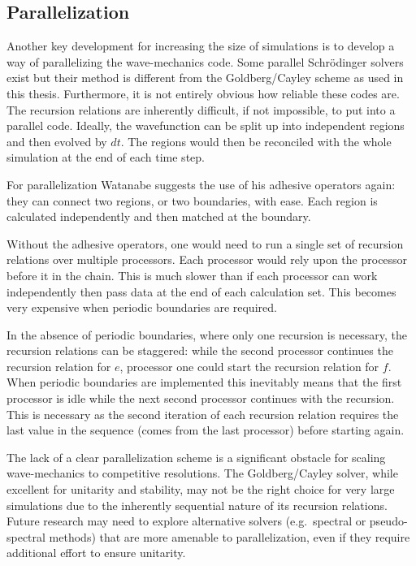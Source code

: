 \subsection{Parallelization}
Another key development for increasing the size of simulations is to develop a way of parallelizing the wave-mechanics code. Some parallel Schr\"odinger solvers \citep{bib_yee, bib_schn, bib_str} exist but their method is different from the Goldberg/Cayley scheme as used in this thesis. Furthermore, it is not entirely obvious how reliable these codes are. The recursion relations are inherently difficult, if not impossible, to put into a parallel code. Ideally, the wavefunction can be split up into independent regions and then evolved by $dt$. The regions would then be reconciled with the whole simulation at the end of each time step.

For parallelization Watanabe suggests the use of his adhesive operators again: they can connect two regions, or two boundaries, with ease. Each region is calculated independently and then matched at the boundary.

Without the adhesive operators, one would need to run a single set of recursion relations over multiple processors. Each processor would rely upon the processor before it in the chain. This is much slower than if each processor can work independently then pass data at the end of each calculation set. This becomes very expensive when periodic boundaries are required.

In the absence of periodic boundaries, where only one recursion is necessary, the recursion relations can be staggered: while the second processor continues the recursion relation for $e$, processor one could start the recursion relation for $f$. When periodic boundaries are implemented this inevitably means that the first processor is idle while the next second processor continues with the recursion. This is necessary as the second iteration of each recursion relation requires the last value in the sequence (comes from the last processor) before starting again.

The lack of a clear parallelization scheme is a significant obstacle for scaling wave-mechanics to competitive resolutions. The Goldberg/Cayley solver, while excellent for unitarity and stability, may not be the right choice for very large simulations due to the inherently sequential nature of its recursion relations. Future research may need to explore alternative solvers (e.g.\ spectral or pseudo-spectral methods) that are more amenable to parallelization, even if they require additional effort to ensure unitarity.



